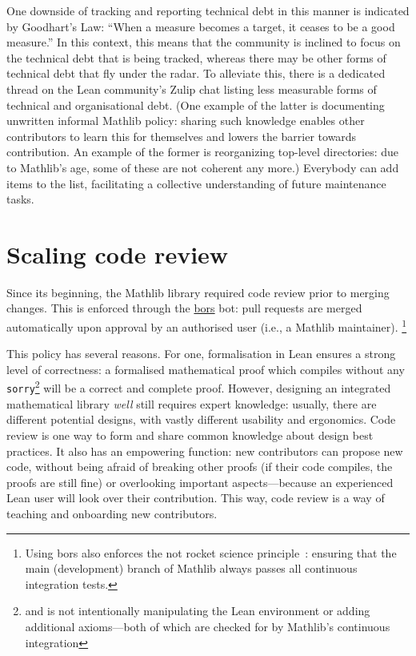 \documentclass[runningheads]{llncs}
\def\mathlib{Mathlib\xspace}
\newcommand{\lean}[1]{\texttt{#1}}
\begin{document}
One downside of tracking and reporting technical debt in this manner is indicated by Goodhart's Law:
``When a measure becomes a target, it ceases to be a good measure.''
In this context, this means that the community is inclined to focus on the technical debt that is being tracked,
whereas there may be other forms of technical debt that fly under the radar.
To alleviate this, there is a dedicated thread on the Lean community's Zulip chat listing less measurable forms of technical and organisational debt.
(One example of the latter is documenting unwritten informal \mathlib policy: sharing such knowledge enables other contributors to learn this for themselves and lowers the barrier towards contribution. An example of the former is reorganizing top-level directories: due to \mathlib's age, some of these are not coherent any more.)
Everybody can add items to the list, facilitating a collective understanding of future maintenance tasks.

\section{Scaling code review}
\label{sec:reviewTooling}

Since its beginning, the \mathlib library required code review prior to merging changes.
This is enforced through the \href{https://bors.tech/}{bors} bot: pull requests are merged automatically upon approval by an authorised user (i.e., a \mathlib maintainer).%
\protect\footnote{Using bors also enforces the not rocket science principle~\cite{GraydonNotRocketScience}: ensuring that the main (development) branch of \mathlib always passes all continuous integration tests.}

This policy has several reasons. For one, formalisation in Lean ensures a strong level of correctness: a formalised mathematical proof which compiles without any \lean{sorry}\footnote{and is not intentionally manipulating the Lean environment or adding additional axioms---both of which are checked for by \mathlib's continuous integration}
will be a correct and complete proof. However, designing an integrated mathematical library \emph{well} still requires expert knowledge: usually, there are different potential designs, with vastly different usability and ergonomics. Code review is one way to form and share common knowledge about design best practices.
It also has an empowering function: new contributors can propose new code, without being afraid of breaking other proofs (if their code compiles, the proofs are still fine) or overlooking important aspects---because an experienced Lean user will look over their contribution. This way, code review is a way of teaching and onboarding new contributors.
\end{document}
